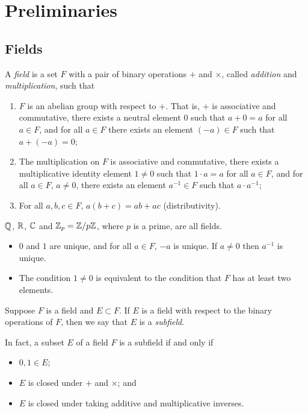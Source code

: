 \section{Preliminaries}
\subsection{Fields}
\begin{definition}
	A \emph{field} is a set $F$ with a pair of binary operations $+$ and $\times$, called \emph{addition} and \emph{multiplication}, such that
	\begin{enumerate}
		\item $F$ is an abelian group with respect to $+$. That is, $+$ is associative and commutative, there exists a neutral element $0$ such that $a + 0 = a$ for all $a \in F$, and for all $a \in F$ there exists an element $(-a) \in F$ such that $a + (-a) = 0$;
		\item The multiplication on $F$ is associative and commutative, there exists a multiplicative identity element $1 \neq 0$ such that $1 \cdot a = a$ for all $a \in F$, and for all $a \in F$, $a \neq 0$, there exists an element $a^{-1} \in F$ such that $a \cdot a^{-1}$;
		\item For all $a, b, c \in F$, $a(b + c) = ab + ac$ (distributivity).
	\end{enumerate}
\end{definition}

\begin{example}
	$\mathbb{Q}$, $\mathbb{R}$, $\mathbb{C}$ and $\mathbb{Z}_p = \mathbb{Z} / p\mathbb{Z}$, where $p$ is a prime, are all fields.
\end{example}

\begin{remarks} \hfill
	\begin{itemize}
		\item $0$ and $1$ are unique, and for all $a \in F$, $-a$ is unique. If $a \neq 0$ then $a^{-1}$ is unique.
		\item The condition $1 \neq 0$ is equivalent to the condition that $F$ has at least two elements.
	\end{itemize}
\end{remarks}

\begin{definition}
	Suppose $F$ is a field and $E \subset F$. If $E$ is a field with respect to the binary operations of $F$, then we say that $E$ is a \emph{subfield}.
	
	In fact, a subset $E$ of a field $F$ is a subfield if and only if
	\begin{itemize}
		\item $0, 1 \in E$;
		\item $E$ is closed under $+$ and $\times$; and
		\item $E$ is closed under taking additive and multiplicative inverses.
	\end{itemize}
\end{definition}

